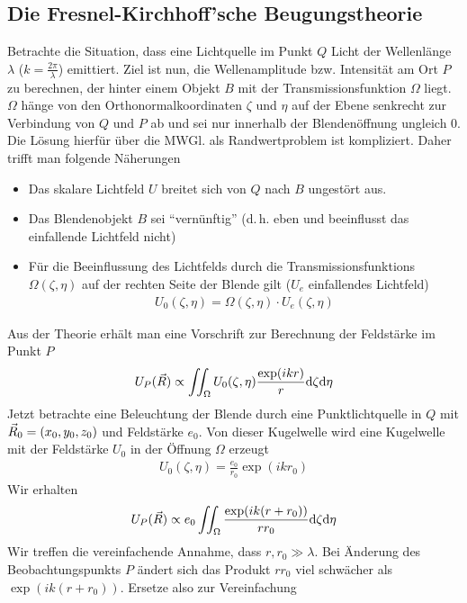 \subsection{Die Fresnel-Kirchhoff'sche Beugungstheorie}
Betrachte die Situation, dass eine Lichtquelle im Punkt $Q$ Licht der
Wellenlänge $\lambda$ ($k=\frac{2\pi}{\lambda}$) emittiert.
Ziel ist nun, die Wellenamplitude bzw. Intensität am Ort $P$ zu
berechnen, der hinter einem Objekt $B$ mit der Transmissionsfunktion
$\Omega$ liegt. $\Omega$ hänge von den Orthonormalkoordinaten $\zeta$
und $\eta$ auf der Ebene senkrecht zur Verbindung von $Q$ und $P$ ab
und sei nur innerhalb der Blendenöffnung ungleich 0.
Die Lösung hierfür über die MWGl. als Randwertproblem ist
kompliziert. Daher trifft man folgende Näherungen
\begin{itemize}
\item Das skalare Lichtfeld $U$ breitet sich von $Q$ nach $B$
  ungestört aus.
\item Das Blendenobjekt $B$ sei \enquote{vernünftig} (d.\,h. eben und
  beeinflusst das einfallende Lichtfeld nicht)
\item Für die Beeinflussung des Lichtfelds durch die
  Transmissionsfunktions $\Omega(\zeta,\eta)$ auf der rechten Seite der
  Blende gilt ($U_e$ einfallendes Lichtfeld)
  \begin{gather*}
    U_0(\zeta,\eta) = \Omega(\zeta,\eta)\cdot U_e(\zeta,\eta)
  \end{gather*}
\end{itemize}
Aus der Theorie erhält man eine Vorschrift zur Berechnung der
Feldstärke im Punkt $P$
\begin{gather*}
  U_P(\vec{R}) \propto \iint_{\Omega} 
  U_0(\zeta,\eta)\frac{\exp(ikr)}{r}\mathrm{d}\zeta\mathrm{d}\eta
\end{gather*}
Jetzt betrachte eine Beleuchtung der Blende durch eine
Punktlichtquelle in $Q$ mit $\vec{R}_0=(x_0,y_0,z_0)$ und Feldstärke
$e_0$.
Von dieser Kugelwelle wird eine Kugelwelle mit der Feldstärke $U_0$ in
der Öffnung $\Omega$ erzeugt
\begin{gather*}
  U_0(\zeta,\eta) = \frac{e_0}{r_0} \exp(ikr_0)
\end{gather*}
Wir erhalten
\begin{gather}
  U_P(\vec{R}) \propto e_0 \iint_{\Omega} 
  \frac{\exp(ik(r+r_0))}{rr_0}\mathrm{d}\zeta\mathrm{d}\eta
\end{gather}
Wir treffen die vereinfachende Annahme, dass $r, r_0\gg\lambda$.
Bei Änderung des Beobachtungspunkts $P$ ändert sich das Produkt $rr_0$
viel schwächer als $\exp(ik(r+r_0))$. Ersetze also zur Vereinfachung
